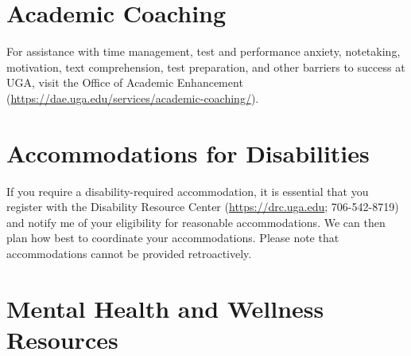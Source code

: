\documentclass[12pt]{article}
\begin{document}
\vspace{-12pt}
\section*{\normalsize Academic Coaching}
\vspace{-4mm}

For assistance with time management, test and performance anxiety,
notetaking, motivation, text comprehension, test preparation, and
other barriers to success at UGA, visit the Office of Academic
Enhancement (\url{https://dae.uga.edu/services/academic-coaching/}). 

\vspace{-12pt}
\section*{\normalsize Accommodations for Disabilities}
\vspace{-4mm}

If you require a disability-required accommodation, it is essential
that you register with the Disability Resource Center (\url{https://drc.uga.edu}; 706-542-8719)
and notify me of your eligibility for reasonable accommodations. We
can then plan how best to coordinate your accommodations. Please note
that accommodations cannot be provided retroactively.



\vspace{-12pt}
\section*{\normalsize Mental Health and Wellness Resources}
\vspace{-4mm}
\end{document}
